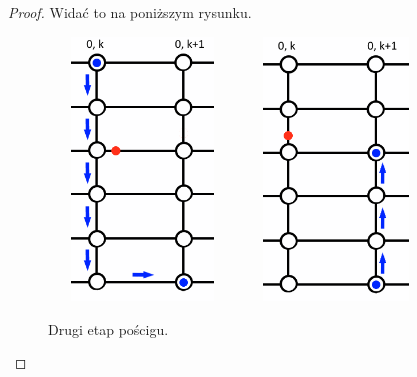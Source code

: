 \documentclass[brudnopis]{xmgr}
\theoremstyle{definition}
\begin{document}
\begin{proof}
	Widać to na poniższym rysunku. 
	\begin{figure}[ht!]
	  \centering
	  \includegraphics[width=5cm,height=7cm]{rysunki/poscig_2.png}
    \includegraphics[width=5cm,height=7cm]{rysunki/poscig_3.png}
	  \caption{Drugi etap pościgu.}
	  \label{fig:drugi krok}
	\end{figure}


\end{proof}
\end{document}
